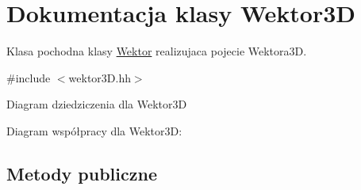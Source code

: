 \hypertarget{class_wektor3_d}{}\section{Dokumentacja klasy Wektor3D}
\label{class_wektor3_d}


Klasa pochodna klasy \hyperlink{class_wektor}{Wektor} realizujaca pojecie Wektora3D.  




{\ttfamily \#include $<$wektor3\+D.\+hh$>$}



Diagram dziedziczenia dla Wektor3D


Diagram współpracy dla Wektor3D\+:
\subsection*{Metody publiczne}
